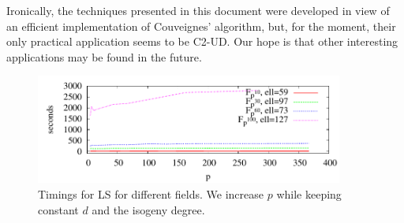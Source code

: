   Ironically, the
techniques presented in this document were developed in view of an
efficient implementation of Couveignes' algorithm, but, for the
moment, their only practical application seems to be C2-UD. Our hope
is that other interesting applications may be found in the future.

\begin{figure}
  \centering
  \includegraphics[width=0.9\textwidth]{isogeny/LSp}
  \caption{Timings for LS for different fields. We increase $p$ while
    keeping constant $d$ and the isogeny degree.}
  \label{fig:LSp}
\end{figure}


%
